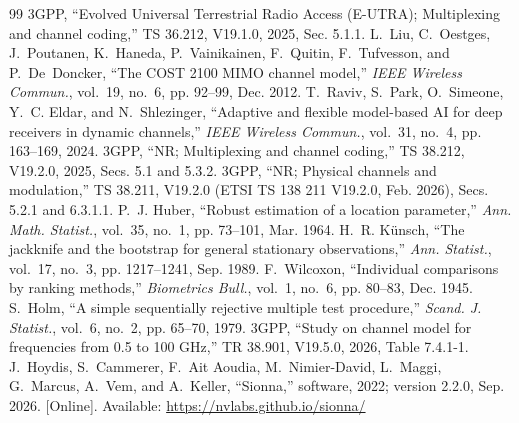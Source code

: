 \documentclass[journal]{IEEEtran}
\theoremstyle{remark}
\begin{document}
\begin{thebibliography}{99}
 3GPP, ``Evolved Universal Terrestrial Radio Access (E-UTRA); Multiplexing and channel coding,'' TS 36.212, V19.1.0, 2025, Sec. 5.1.1.
 L.~Liu, C.~Oestges, J.~Poutanen, K.~Haneda, P.~Vainikainen, F.~Quitin, F.~Tufvesson, and P.~De~Doncker, ``The COST 2100 MIMO channel model,'' \emph{IEEE Wireless Commun.}, vol.~19, no.~6, pp. 92--99, Dec. 2012.
 T.~Raviv, S.~Park, O.~Simeone, Y.~C. Eldar, and N.~Shlezinger, ``Adaptive and flexible model-based AI for deep receivers in dynamic channels,'' \emph{IEEE Wireless Commun.}, vol.~31, no.~4, pp. 163--169, 2024.
 3GPP, ``NR; Multiplexing and channel coding,'' TS 38.212, V19.2.0, 2025, Secs. 5.1 and 5.3.2.
 3GPP, ``NR; Physical channels and modulation,'' TS 38.211, V19.2.0 (ETSI TS 138 211 V19.2.0, Feb. 2026), Secs. 5.2.1 and 6.3.1.1.
 P.~J. Huber, ``Robust estimation of a location parameter,'' \emph{Ann. Math. Statist.}, vol.~35, no.~1, pp. 73--101, Mar. 1964.
 H.~R. K{\"u}nsch, ``The jackknife and the bootstrap for general stationary observations,'' \emph{Ann. Statist.}, vol.~17, no.~3, pp. 1217--1241, Sep. 1989.
 F.~Wilcoxon, ``Individual comparisons by ranking methods,'' \emph{Biometrics Bull.}, vol.~1, no.~6, pp. 80--83, Dec. 1945.
 S.~Holm, ``A simple sequentially rejective multiple test procedure,'' \emph{Scand. J. Statist.}, vol.~6, no.~2, pp. 65--70, 1979.
 3GPP, ``Study on channel model for frequencies from 0.5 to 100 GHz,'' TR 38.901, V19.5.0, 2026, Table 7.4.1-1.
 J.~Hoydis, S.~Cammerer, F.~Ait Aoudia, M.~Nimier-David, L.~Maggi, G.~Marcus, A.~Vem, and A.~Keller, ``Sionna,'' software, 2022; version 2.2.0, Sep. 2026. [Online]. Available: \url{https://nvlabs.github.io/sionna/}
\end{thebibliography}
\end{document}
